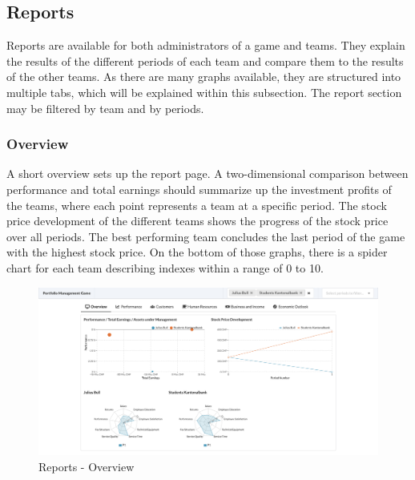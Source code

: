 \subsection{Reports}
Reports are available for both administrators of a game and teams. They explain the results of the different periods of each team and compare them to the results of the other teams. As there are many graphs available, they are structured into multiple tabs, which will be explained within this subsection. The report section may be filtered by team and by periods.

\subsubsection{Overview}
A short overview sets up the report page. A two-dimensional comparison between performance and total earnings should summarize up the investment profits of the teams, where each point represents a team at a specific period. The stock price development of the different teams shows the progress of the stock price over all periods. The best performing team concludes the last period of the game with the highest stock price. On the bottom of those graphs, there is a spider chart for each team describing indexes within a range of 0 to 10.
\begin{figure}[h!]
  \centering
  \includegraphics[scale=0.2]{img/application-overview/reports/01_overview.png}
  \caption{Reports - Overview}
\end{figure}

